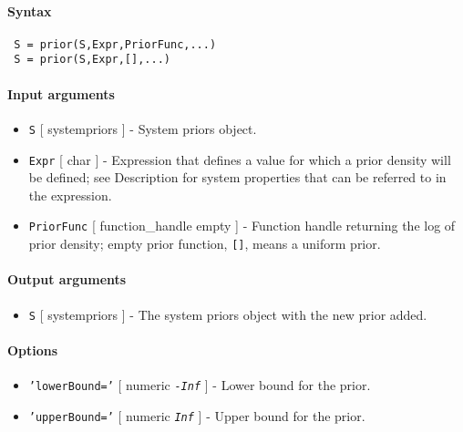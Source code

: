 


	\paragraph{Syntax}
 
 \begin{verbatim}
 S = prior(S,Expr,PriorFunc,...)
 S = prior(S,Expr,[],...)
 \end{verbatim}
 
 \paragraph{Input arguments}
 
 \begin{itemize}
 \item
   \texttt{S} {[} systempriors {]} - System priors object.
 \item
   \texttt{Expr} {[} char {]} - Expression that defines a value for which
   a prior density will be defined; see Description for system properties
   that can be referred to in the expression.
 \item
   \texttt{PriorFunc} {[} function\_handle \textbar{} empty {]} -
   Function handle returning the log of prior density; empty prior
   function, \texttt{{[}{]}}, means a uniform prior.
 \end{itemize}
 
 \paragraph{Output arguments}
 
 \begin{itemize}
 \item
   \texttt{S} {[} systempriors {]} - The system priors object with the
   new prior added.
 \end{itemize}
 
 \paragraph{Options}
 
 \begin{itemize}
 \item
   \texttt{'lowerBound='} {[} numeric \textbar{} \emph{\texttt{-Inf}} {]}
   - Lower bound for the prior.
 \item
   \texttt{'upperBound='} {[} numeric \textbar{} \emph{\texttt{Inf}} {]}
   - Upper bound for the prior.
 \end{itemize}
 
